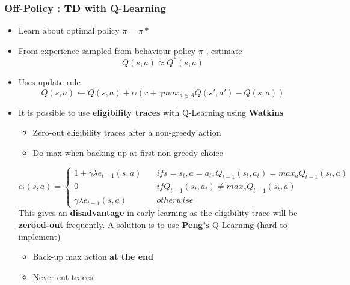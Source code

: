 \documentclass[12pt]{article} %
\begin{document}
\subsubsection{Off-Policy : TD with Q-Learning}
\begin{itemize}
\item Learn about optimal policy $\pi=\pi*$
\item From experience sampled from behaviour policy $\bar{\pi}$ , estimate
$$ Q(s,a) \approx Q^*(s,a)$$
\item Uses update rule 
$$ Q(s,a) \leftarrow Q(s,a)+\alpha(r+ \gamma max_{a \in A}Q(s',a')-Q(s,a))$$

\item It is possible to use \textbf{eligibility traces} with Q-Learning using \textbf{Watkins}
\begin{itemize}
\item Zero-out eligibility traces after a non-greedy action
\item Do max when backing up at first non-greedy choice
\end{itemize}
$$ e_t(s,a) = \begin{cases}
1+\gamma \lambda e_{t-1}(s,a) \quad & if s=s_t,a=a_t,Q_{t-1}(s_t,a_t)= max_aQ_{t-1}(s_t,a)\\
0 \quad & if Q_{t-1}(s_t,a_t) \neq max_aQ_{t-1}(s_t,a)\\
\gamma\lambda e_{t-1}(s,a) \quad & otherwise
\end{cases}$$
This gives an \textbf{disadvantage} in early learning as the eligibility trace will be \textbf{zeroed-out} frequently. A solution is to use \textbf{Peng's} Q-Learning (hard to implement)
\begin{itemize}
\item  Back-up max action \textbf{at the end}
\item Never cut traces
\end{itemize}
\end{itemize}
\end{document}
